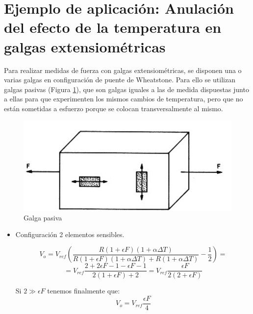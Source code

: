 \section{Ejemplo de aplicación: Anulación del efecto de la temperatura en galgas extensiométricas}

Para realizar medidas de fuerza con galgas extensiométricas, se disponen una o varias galgas en configuración de puente de Wheatstone. Para ello se utilizan galgas pasivas (Figura \ref{fig:galga-pasiva}), que son galgas iguales a las de medida dispuestas junto a ellas para que experimenten los mismos cambios de temperatura, pero que no están sometidas a esfuerzo porque se colocan transversalmente al mismo.

\begin{figure}[H]
    \centering
    \includegraphics[width=0.5\linewidth]{Imagenes/Galga Activa y Pasiva.png}
    \caption{Galga pasiva}
    \label{fig:galga-pasiva}
\end{figure}
\begin{itemize}
    \item Configuración 2 elementos sensibles.

    \[V_o = V_{ref} \left( \frac{R (1 + \epsilon F)  (1 + \alpha \Delta T)}{R (1 + \epsilon F) (1 + \alpha \Delta T) + R (1 + \alpha \Delta T)} - \frac{1}{2} \right) = \]
    \[= V_{ref} \frac{2 + 2 \epsilon F - 1 - \epsilon F - 1}{2(1 + \epsilon F) + 2} = V_{ref} \frac{\epsilon F}{2(2 + \epsilon F)}\]

    Si \(2 \gg \epsilon F\) tenemos finalmente que:
    \begin{equation}
        V_o = V_{ref} \frac{\epsilon F}{4}
    \end{equation}

\end{itemize}